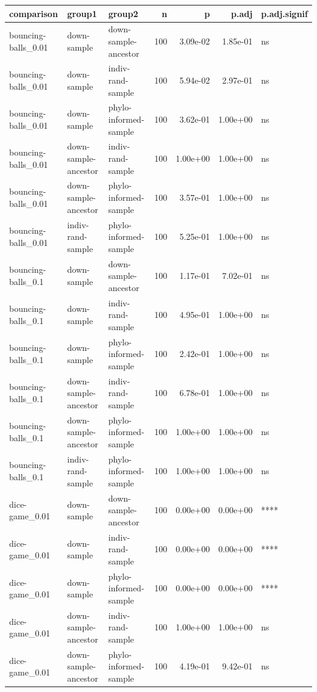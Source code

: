 \documentclass[
]{book}
\begin{document}
\begin{table}
\centering
\begin{tabular}[t]{l|l|l|r|r|r|l}
\hline
comparison & group1 & group2 & n & p & p.adj & p.adj.signif\\
\hline
bouncing-balls\_0.01 & down-sample & down-sample-ancestor & 100 & 3.09e-02 & 1.85e-01 & ns\\
\hline
bouncing-balls\_0.01 & down-sample & indiv-rand-sample & 100 & 5.94e-02 & 2.97e-01 & ns\\
\hline
bouncing-balls\_0.01 & down-sample & phylo-informed-sample & 100 & 3.62e-01 & 1.00e+00 & ns\\
\hline
bouncing-balls\_0.01 & down-sample-ancestor & indiv-rand-sample & 100 & 1.00e+00 & 1.00e+00 & ns\\
\hline
bouncing-balls\_0.01 & down-sample-ancestor & phylo-informed-sample & 100 & 3.57e-01 & 1.00e+00 & ns\\
\hline
bouncing-balls\_0.01 & indiv-rand-sample & phylo-informed-sample & 100 & 5.25e-01 & 1.00e+00 & ns\\
\hline
bouncing-balls\_0.1 & down-sample & down-sample-ancestor & 100 & 1.17e-01 & 7.02e-01 & ns\\
\hline
bouncing-balls\_0.1 & down-sample & indiv-rand-sample & 100 & 4.95e-01 & 1.00e+00 & ns\\
\hline
bouncing-balls\_0.1 & down-sample & phylo-informed-sample & 100 & 2.42e-01 & 1.00e+00 & ns\\
\hline
bouncing-balls\_0.1 & down-sample-ancestor & indiv-rand-sample & 100 & 6.78e-01 & 1.00e+00 & ns\\
\hline
bouncing-balls\_0.1 & down-sample-ancestor & phylo-informed-sample & 100 & 1.00e+00 & 1.00e+00 & ns\\
\hline
bouncing-balls\_0.1 & indiv-rand-sample & phylo-informed-sample & 100 & 1.00e+00 & 1.00e+00 & ns\\
\hline
dice-game\_0.01 & down-sample & down-sample-ancestor & 100 & 0.00e+00 & 0.00e+00 & ****\\
\hline
dice-game\_0.01 & down-sample & indiv-rand-sample & 100 & 0.00e+00 & 0.00e+00 & ****\\
\hline
dice-game\_0.01 & down-sample & phylo-informed-sample & 100 & 0.00e+00 & 0.00e+00 & ****\\
\hline
dice-game\_0.01 & down-sample-ancestor & indiv-rand-sample & 100 & 1.00e+00 & 1.00e+00 & ns\\
\hline
dice-game\_0.01 & down-sample-ancestor & phylo-informed-sample & 100 & 4.19e-01 & 9.42e-01 & ns\\

\end{tabular}
\end{table}
\end{document}
